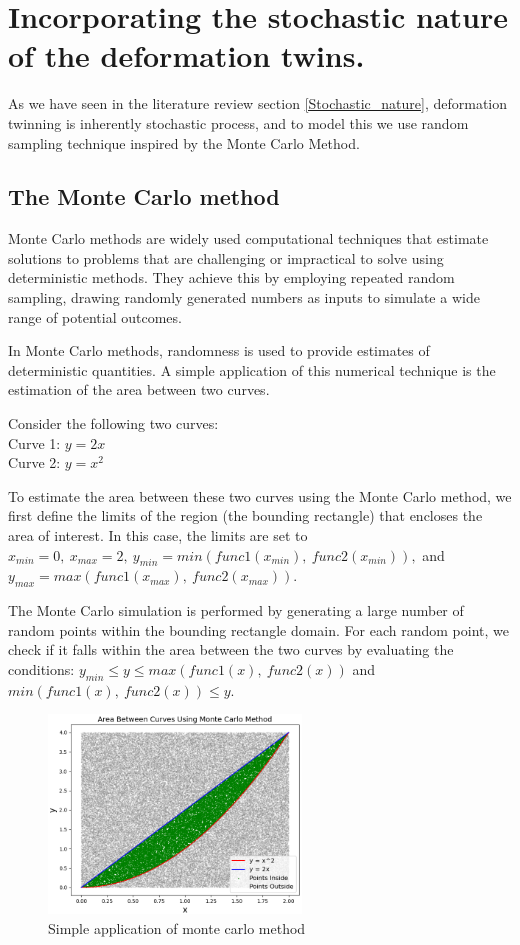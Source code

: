 \section{Incorporating the stochastic nature of the deformation twins.}

As we have seen in the literature review section \ref{Stochastic_nature}, deformation twinning is inherently stochastic process, and to model this we use random sampling technique inspired by the Monte Carlo Method.

\subsection{The Monte Carlo method}

Monte Carlo methods are widely used computational techniques that estimate solutions to problems that are challenging or impractical to solve using deterministic methods. They achieve this by employing repeated random sampling, drawing randomly generated numbers as inputs to simulate a wide range of potential outcomes.

In Monte Carlo methods, randomness is used to provide estimates of deterministic quantities. A simple application of this numerical technique is the estimation of the area between two curves.

Consider the following two curves: \\
Curve 1: $y = 2x$ \\
Curve 2: $y = x^2$

To estimate the area between these two curves using the Monte Carlo method, we first define the limits of the region (the bounding rectangle) that encloses the area of interest. In this case, the limits are set to $x_{min} = 0,\ x_{max} = 2,\ y_{min} = min(func1(x_{min}),\ func2(x_{min})),$ and $y_{max} = max(func1(x_{max}),\ func2(x_{max}))$.

The Monte Carlo simulation is performed by generating a large number of random points within the bounding rectangle domain. For each random point, we check if it falls within the area between the two curves by evaluating the conditions: $ y_{min} \leq y \leq max(func1(x),\ func2(x)) $ and $ min(func1(x),\ func2(x)) \leq y $.

\begin{figure}[H]
  \centering
  \includegraphics[width=0.6\textwidth]{images/monte_carlo_area.png}
  \caption{Simple application of monte carlo method}
  \label{Monte_carlo_app}
\end{figure}



